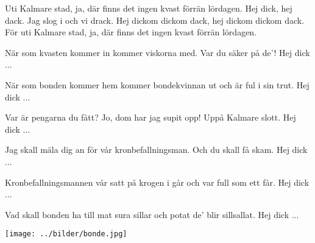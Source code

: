 

\beginverse*
Uti Kalmare stad,
ja, där finns det ingen kvast
förrän lördagen.
Hej dick,
hej dack.
Jag slog i
och vi drack.
Hej dickom dickom dack,
hej dickom dickom dack.
För uti Kalmare stad,
ja, där finns det ingen kvast
förrän lördagen.
\endverse

\beginverse*
När som kvasten kommer in
kommer viskorna med.
Var du säker på de'!
Hej dick ...
\endverse

\beginverse*
När som bonden kommer hem
kommer bondekvinnan ut
och är ful i sin trut.
Hej dick ...
\endverse

\beginverse*
Var är pengarna du fått?
Jo, dom har jag supit opp!
Uppå Kalmare slott.
Hej dick ...
\endverse

\beginverse*
Jag skall mäla dig an
för vår kronbefallningsman.
Och du skall få skam.
Hej dick ...
\endverse

\beginverse*
Kronbefallningsmannen vår
satt på krogen i går
och var full som ett får.
Hej dick ...
\endverse

\beginverse*
Vad skall bonden ha till mat
sura sillar och potat
de' blir sillsallat.
Hej dick ...
\endverse
\endsong
\begin{intersong}
	\begin{center}
		\texttt{[image: ../bilder/bonde.jpg]} 
	\end{center}
\end{intersong}